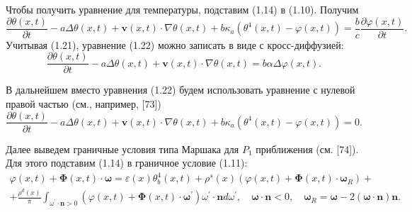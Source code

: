 Чтобы получить уравнение для температуры, подставим (1.14) в (1.10).
Получим
\[
    \frac{\partial \theta(x, t)}{\partial t}-a \Delta \theta(x, t)+\mathbf{v}(x, t) \cdot
    \nabla \theta(x, t)+b \kappa_{a}\left(\theta^{4}(x, t)-\varphi(x, t)\right)=\frac{b}{c}
    \frac{\partial \varphi(x, t)}{\partial t}.
\]
Учитывая (1.21), уравнение (1.22) можно записать в виде с кросс-диффузией:
\[
    \frac{\partial \theta(x, t)}{\partial t}-a \Delta \theta(x, t)+\mathbf{v}(x, t) \cdot
    \nabla \theta(x, t)=b \alpha \Delta \varphi(x, t).
\]

В дальнейшем вместо уравнения (1.22) будем использовать уравнение с нулевой правой частью (см., например, [73])
\[
    \frac{\partial \theta(x, t)}{\partial t}-a \Delta \theta(x, t)+\mathbf{v}(x, t) \cdot \nabla
    \theta(x, t)+b \kappa_{a}\left(\theta^{4}(x, t)-\varphi(x, t)\right)=0.
\]

Далее выведем граничные условия типа Маршака для $P_{1}$ приближения (см. [74]).
Для этого подставим (1.14) в граничное условие (1.11):
\[
    \begin{gathered}
        \varphi(x, t)+\boldsymbol{\Phi}(x, t) \cdot \boldsymbol{\omega}=\varepsilon(x)
        \theta_{b}^{4}(x, t)+\rho^{s}(x)\left(\varphi(x, t)+\boldsymbol{\Phi}(x, t)
        \cdot \boldsymbol{\omega}_{R}\right)+ \\
        +\frac{\rho^{d}(x)}{\pi} \int_{\omega^{\prime} \cdot
        \mathbf{n}>0}\left(\varphi(x, t)+\boldsymbol{\Phi}(x, t) \cdot
        \boldsymbol{\omega}^{\prime}\right) \omega^{\prime} \cdot \mathbf{n} d \omega^{\prime},
        \quad \boldsymbol{\omega} \cdot \mathbf{n}<0, \quad
        \boldsymbol{\omega}_{R}=\boldsymbol{\omega}-2(\boldsymbol{\omega} \cdot
        \mathbf{n}) \mathbf{n}.
    \end{gathered}
\]


